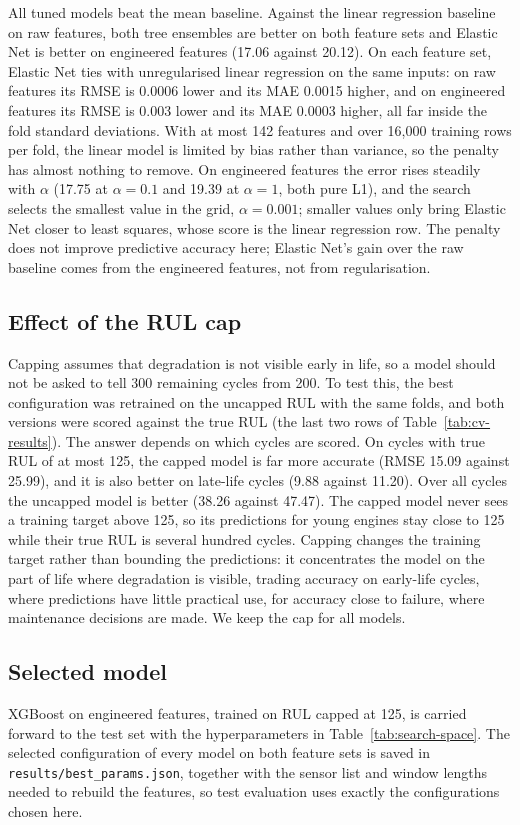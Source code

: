All tuned models beat the mean baseline. Against the linear regression
baseline on raw features, both tree ensembles are better on both feature
sets and Elastic Net is better on engineered features (17.06 against
20.12). On each feature set, Elastic Net ties with unregularised linear
regression on the same inputs: on raw features its RMSE is 0.0006 lower
and its MAE 0.0015 higher, and on engineered features its RMSE is 0.003
lower and its MAE 0.0003 higher, all far inside the fold standard
deviations. With at most 142 features and over 16,000 training rows per
fold, the linear model is limited by bias rather than variance, so the
penalty has almost nothing to remove. On engineered features the error
rises steadily with $\alpha$ (17.75 at $\alpha = 0.1$ and 19.39 at
$\alpha = 1$, both pure L1), and the search selects the smallest value in
the grid, $\alpha = 0.001$; smaller values only bring Elastic Net closer
to least squares, whose score is the linear regression row. The penalty
does not improve predictive accuracy here; Elastic Net's gain over the
raw baseline comes from the engineered features, not from regularisation.

\subsection{Effect of the RUL cap}
Capping assumes that degradation is not visible early in life, so a model
should not be asked to tell 300 remaining cycles from 200. To test this,
the best configuration was retrained on the uncapped RUL with the same
folds, and both versions were scored against the true RUL (the last two
rows of Table~\ref{tab:cv-results}). The answer depends on which cycles
are scored. On cycles with true RUL of at most 125, the capped model is
far more accurate (RMSE 15.09 against 25.99), and it is also better on
late-life cycles (9.88 against 11.20). Over all cycles the uncapped model
is better (38.26 against 47.47). The capped model never sees a training
target above 125, so its predictions for young engines stay close to 125
while their true RUL is several hundred cycles. Capping changes the
training target rather than bounding the predictions: it concentrates the
model on the part of life where degradation is visible, trading accuracy
on early-life cycles, where predictions have little practical use, for
accuracy close to failure, where maintenance decisions are made. We keep
the cap for all models.

\subsection{Selected model}
XGBoost on engineered features, trained on RUL capped at 125, is carried
forward to the test set with the hyperparameters in
Table~\ref{tab:search-space}. The selected configuration of every model on
both feature sets is saved in \texttt{results/best\_params.json}, together
with the sensor list and window lengths needed to rebuild the features, so
test evaluation uses exactly the configurations chosen here.

